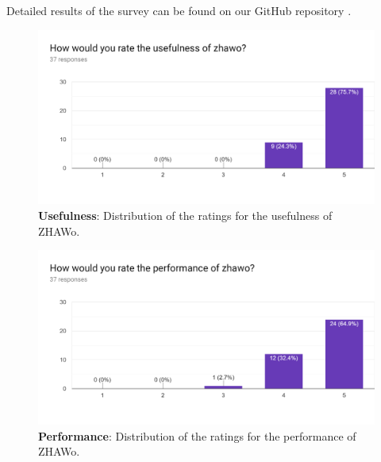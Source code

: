 \begin{markdown}
Detailed results of the survey can be found on our GitHub repository \cite{OurGithub}.

\newpage

\begin{figure}[H]
  \includegraphics[width=13cm, center]{./figures/bar_1.png}
  \captionsetup{width=15.5cm}
  \caption [Usefulness survey results]{\textbf{Usefulness}: Distribution of the ratings for the usefulness of ZHAWo.}
  \label{fig:BarUsefulness}
\end{figure}

\vspace{-5ex} %

\begin{figure}[H]
  \includegraphics[width=13cm, center]{./figures/bar_2.png}
  \captionsetup{width=15.5cm}
  \caption [Performance survey results]{\textbf{Performance}: Distribution of the ratings for the performance of ZHAWo.}
  \label{fig:BarPerformance}
\end{figure}

\vspace{-5ex} %


\end{markdown}
